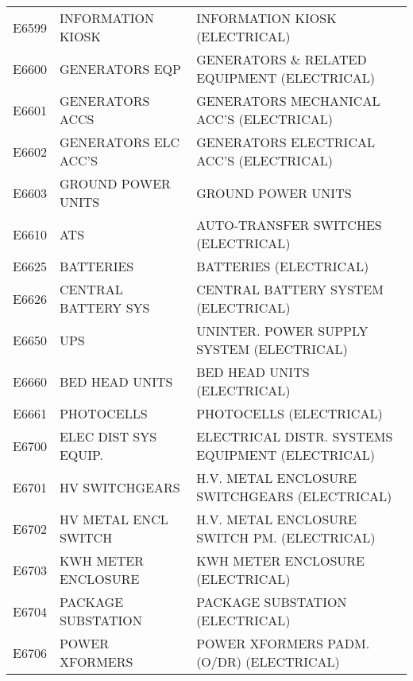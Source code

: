 \begin{longtable}[l]{l%
                  l|%
                  l|}
\rowcolor{thetableheadbgcolor!0.25!white} E6599       & INFORMATION KIOSK   & INFORMATION KIOSK (ELECTRICAL)   \\
\rowcolor{thetableheadbgcolor!0.25!white} E6600       & GENERATORS EQP   & GENERATORS \& RELATED EQUIPMENT (ELECTRICAL)   \\
\rowcolor{thetableheadbgcolor!0.25!white} E6601       & GENERATORS ACCS   & GENERATORS MECHANICAL ACC'S (ELECTRICAL)   \\
\rowcolor{thetableheadbgcolor!0.25!white} E6602       & GENERATORS ELC ACC'S   & GENERATORS ELECTRICAL ACC'S (ELECTRICAL)   \\
\rowcolor{thetableheadbgcolor!0.25!white} E6603       & GROUND POWER UNITS   & GROUND POWER UNITS   \\
\rowcolor{thetableheadbgcolor!0.25!white} E6610       & ATS   & AUTO-TRANSFER SWITCHES (ELECTRICAL)   \\
\rowcolor{thetableheadbgcolor!0.25!white} E6625       & BATTERIES   & BATTERIES (ELECTRICAL)   \\
\rowcolor{thetableheadbgcolor!0.25!white} E6626       & CENTRAL BATTERY SYS   & CENTRAL BATTERY SYSTEM (ELECTRICAL)   \\
\rowcolor{thetableheadbgcolor!0.25!white} E6650       & UPS   & UNINTER. POWER SUPPLY SYSTEM (ELECTRICAL)   \\
\rowcolor{thetableheadbgcolor!0.25!white} E6660       & BED HEAD UNITS   & BED HEAD UNITS (ELECTRICAL)   \\
\rowcolor{thetableheadbgcolor!0.25!white} E6661       & PHOTOCELLS   & PHOTOCELLS (ELECTRICAL)   \\
\rowcolor{thetableheadbgcolor!0.25!white} E6700       & ELEC DIST SYS EQUIP.   & ELECTRICAL DISTR. SYSTEMS EQUIPMENT (ELECTRICAL)   \\
\rowcolor{thetableheadbgcolor!0.25!white} E6701       & HV SWITCHGEARS   & H.V. METAL ENCLOSURE SWITCHGEARS (ELECTRICAL)   \\
\rowcolor{thetableheadbgcolor!0.25!white} E6702       & HV METAL ENCL SWITCH   & H.V. METAL ENCLOSURE SWITCH PM. (ELECTRICAL)   \\
\rowcolor{thetableheadbgcolor!0.25!white} E6703       & KWH METER ENCLOSURE   & KWH METER ENCLOSURE (ELECTRICAL)   \\
\rowcolor{thetableheadbgcolor!0.25!white} E6704       & PACKAGE SUBSTATION   & PACKAGE SUBSTATION (ELECTRICAL)   \\
\rowcolor{thetableheadbgcolor!0.25!white} E6706       & POWER XFORMERS   & POWER XFORMERS PADM. (O/DR) (ELECTRICAL)   \\

\end{longtable}

